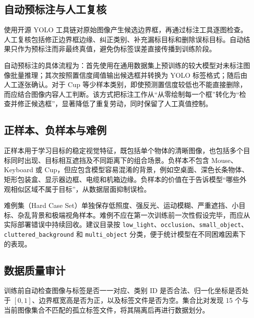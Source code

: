 \documentclass[UTF8,fontset=none,a4paper,11pt]{ctexart}
\begin{document}
\subsection{自动预标注与人工复核}
使用开源 YOLO 工具链对原始图像产生候选边界框，再通过标注工具逐图检查。人工复核包括修正边界框边缘、纠正类别、补充漏标目标和删除误标目标。自动结果只作为预标注而非最终真值，避免伪标签误差直接传播到训练阶段。

自动预标注的具体流程为：首先使用在通用数据集上预训练的较大模型对未标注图像批量推理；其次按照置信度阈值输出候选框并转换为 YOLO 标签格式；随后由人工逐张确认。对于 Cup 等少样本类别，即使预测置信度较低也不能直接删除，而应结合图像内容人工判断。该方式把标注工作从“从零绘制每一个框”转化为“检查并修正候选框”，显著降低了重复劳动，同时保留了人工真值控制。

\subsection{正样本、负样本与难例}
正样本用于学习目标的稳定视觉特征，既包括单个物体的清晰图像，也包括多个目标同时出现、目标相互遮挡及不同距离下的组合场景。负样本不包含 Mouse、Keyboard 或 Cup，但应包含模型容易混淆的背景，例如空桌面、深色长条物体、矩形包装盒、显示器边框、电缆和机箱边缘。负样本的价值在于告诉模型“哪些外观相似区域不属于目标”，从数据层面抑制误检。

难例集（Hard Case Set）单独保存低照度、强反光、运动模糊、严重遮挡、小目标、杂乱背景和极端视角样本。难例不应在第一次训练前一次性假设完毕，而应从实际部署错误中持续回收。建议目录按 \texttt{low\_light}、\texttt{occlusion}、\texttt{small\_object}、\texttt{cluttered\_background} 和 \texttt{multi\_object} 分类，便于统计模型在不同困难因素下的表现。
\subsection{数据质量审计}
训练前自动检查图像与标签是否一一对应、类别 ID 是否合法、归一化坐标是否处于 $[0,1]$、边界框宽高是否为正，以及标签文件是否为空。集合比对发现 15 个与当前图像集合不匹配的孤立标签文件，将其隔离后再进行数据划分。
\end{document}
